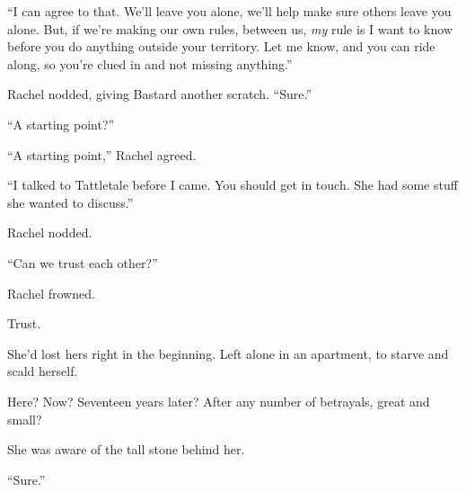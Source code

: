 ``I can agree to that.  We'll leave you alone, we'll help make sure others leave you alone.  But, if we're making our own rules, between us, \emph{my} rule is I want to know before you do anything outside your territory.  Let me know, and you can ride along, so you're clued in and not missing anything.''



Rachel nodded, giving Bastard another scratch.  ``Sure.''



``A starting point?''



``A starting point,'' Rachel agreed.



``I talked to Tattletale before I came.  You should get in touch.  She had some stuff she wanted to discuss.''



Rachel nodded.



``Can we trust each other?''



Rachel frowned.



Trust.



She'd lost hers right in the beginning.  Left alone in an apartment, to starve and scald herself.



Here?  Now?  Seventeen years later?  After any number of betrayals, great and small?



She was aware of the tall stone behind her.



``Sure.''





